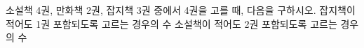 소설책 4권, 만화책 2권, 잡지책 3권 중에서 4권을 고를 때, 다음을 구하시오. 
 잡지책이 적어도 1권 포함되도록 고르는 경우의 수
 소설책이 적어도 2권 포함되도록 고르는 경우의 수
